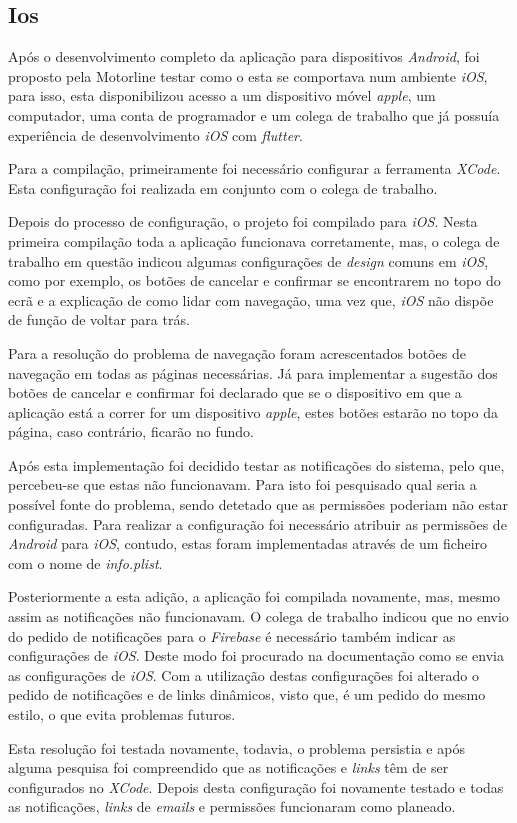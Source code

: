 \subsection{Ios}
Após o desenvolvimento completo da aplicação para dispositivos \textit{Android}, foi proposto pela Motorline testar como o esta se comportava num ambiente \textit{iOS}, para isso, esta disponibilizou acesso a um dispositivo móvel \textit{apple}, um computador, uma conta de programador e um colega de trabalho que já possuía experiência de desenvolvimento \textit{iOS} com \textit{flutter}.

Para a compilação, primeiramente foi necessário configurar a ferramenta \textit{XCode}. Esta configuração foi realizada em conjunto com o colega de trabalho.

Depois do processo de configuração, o projeto foi compilado para \textit{iOS}. Nesta primeira compilação toda a aplicação funcionava corretamente, mas, o colega de trabalho em questão indicou algumas configurações de \textit{design} comuns em \textit{iOS}, como por exemplo, os botões de cancelar e confirmar se encontrarem no topo do ecrã e a explicação de como lidar com navegação, uma vez que, \textit{iOS} não dispõe de função de voltar para trás.

Para a resolução do problema de navegação foram acrescentados botões de navegação em todas as páginas necessárias. Já para implementar a sugestão dos botões de cancelar e confirmar foi declarado que se o dispositivo em que a aplicação está a correr for um dispositivo \textit{apple}, estes botões estarão no topo da página, caso contrário, ficarão no fundo.

Após esta implementação foi decidido testar as notificações do sistema, pelo que, percebeu-se que estas não funcionavam. Para isto foi pesquisado qual seria a possível fonte do problema, sendo detetado que as permissões poderiam não estar configuradas. Para realizar a configuração foi necessário atribuir as permissões de \textit{Android} para \textit{iOS}, contudo, estas foram implementadas através de um ficheiro com o nome de \textit{info.plist}.

Posteriormente a esta adição, a aplicação foi compilada novamente, mas, mesmo assim as notificações não funcionavam. O colega de trabalho indicou que no envio do pedido de notificações para o \textit{Firebase} é necessário também indicar as configurações de \textit{iOS}. Deste modo foi procurado na documentação como se envia as configurações de \textit{iOS}. Com a utilização destas configurações foi alterado o pedido de notificações e de links dinâmicos, visto que, é um pedido do mesmo estilo, o que evita problemas futuros.

Esta resolução foi testada novamente, todavia, o problema persistia e após alguma pesquisa foi compreendido que as notificações e \textit{links} têm de ser configurados no \textit{XCode}. Depois desta configuração foi novamente testado e todas as notificações, \textit{links} de \textit{emails} e permissões funcionaram como planeado.